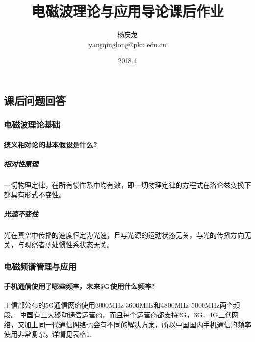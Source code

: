 \documentclass[UTF8]{article}
\begin{document}
\begin{CJK}{UTF8}{gkai}
\title{电磁波理论与应用导论课后作业}
\author{杨庆龙\\yangqinglong@pku.edu.cn}
\date{2018.4}
\maketitle

\part{课后问题回答}
\section{电磁波理论基础}
\subsection{狭义相对论的基本假设是什么?}
\subsubsection{相对性原理}
一切物理定律，在所有惯性系中均有效，即一切物理定律的方程式在洛仑兹变换下都具有形式不变性。
\subsubsection{光速不变性}
光在真空中传播的速度恒定为光速，且与光源的运动状态无关，与光的传播方向无关，与观察者所处惯性系状态无关。
\section{电磁频谱管理与应用}
\subsection{手机通信使用了哪些频率，未来5G使用什么频率?}
工信部公布的5G通信网络使用3000MHz-3600MHz和4800MHz-5000MHz两个频段。
中国有三大移动通信运营商，而且每个运营商都支持2G，3G，4G三代网络，又加上同一代通信网络也会有不同的解决方案，所以中国国内手机通信的频率使用非常复杂。详情见表格1.


\end{CJK}
\end{document}
